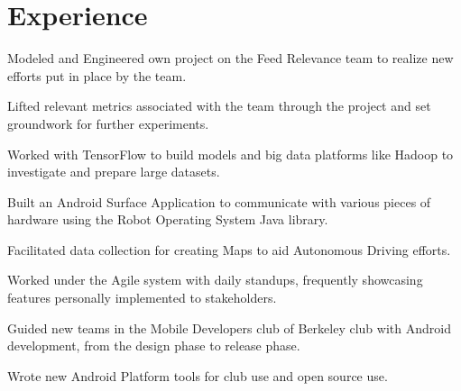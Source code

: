 \documentclass[]{format}
\begin{document}
\begin{minipage}[t]{0.66\textwidth} 


\section{Experience}
\vspace{\topsep} %
\begin{tightemize}
\item Modeled and Engineered own project on the Feed Relevance team to realize new efforts put in place by the team.
\item Lifted relevant metrics associated with the team through the project and set groundwork for further experiments.
\item Worked with TensorFlow to build models and big data platforms like Hadoop to investigate and prepare large datasets.
\end{tightemize}
\sectionsep

\begin{tightemize}
\item Built an Android Surface Application to communicate with various pieces of hardware using the Robot
Operating System Java library.
\item Facilitated data collection for creating Maps to aid Autonomous Driving efforts.
\item Worked under the Agile system with daily standups, frequently showcasing features personally implemented to stakeholders.
\end{tightemize}
\sectionsep

\begin{tightemize}
\item Guided new teams in the Mobile Developers club of Berkeley club with Android development, from the design phase
to release phase.
\item Wrote new Android Platform tools for club use and open source use.
\end{tightemize}
\sectionsep


\end{minipage}
\end{document}
